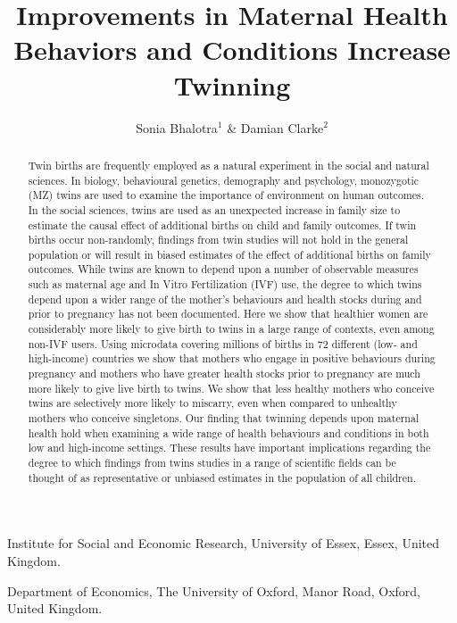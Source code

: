 \documentclass{nature}
\title{Improvements in Maternal Health Behaviors and Conditions Increase Twinning}
\author{Sonia Bhalotra$^{1}$ \& Damian Clarke$^2$}
\begin{document}
\maketitle

\begin{affiliations}
 \item Institute for Social and Economic Research, University of Essex, Essex, United Kingdom.
 \item Department of Economics, The University of Oxford, Manor Road, Oxford, United Kingdom.
\end{affiliations}

\begin{linenumbers}
\begin{abstract}
Twin births are frequently employed as a natural experiment in the social and natural sciences\cite{Boomsmaetal2002,Poldermanetal2015}.  In biology, behavioural genetics, demography and psychology, monozygotic (MZ) twins are used to examine the importance of environment on human outcomes\cite{Thorndike1905,Boomsmaetal2002,Poldermanetal2015,Phillips1993,BouchardPropping1993,McClearnetal1997,Nisen2013}. In the social sciences, twins are used as an unexpected increase in family size to estimate the causal effect of additional births on child and family outcomes\cite{WolpinRosenzweig2000,RosenzweigWolpin1980,AngristEvans1988}.  If twin births occur non-randomly, findings from twin studies will not hold in the general population or will result in biased estimates of the effect of additional births on family outcomes.  While twins are known to depend upon a number of observable measures such as maternal age and In Vitro Fertilization (IVF) use\cite{Hall2003,Hoekstraetal2008,Vitthalaetal2009}, the degree to which twins depend upon a wider range of the mother's behaviours and health stocks during and prior to pregnancy has not been documented.  Here we show that healthier women are considerably more likely to give birth to twins in a large range of contexts, even among non-IVF users.  Using microdata covering millions of births in 72 different (low- and high-income) countries we show that mothers who engage in positive behaviours during pregnancy and mothers who have greater health stocks prior to pregnancy are much more likely to give live birth to twins. We show that less healthy mothers who conceive twins are selectively more likely to miscarry, even when compared to unhealthy mothers who conceive singletons.  Our finding that twinning depends upon maternal health hold when examining a wide range of health behaviours and conditions in both low and high-income settings.  These results have important implications regarding the degree to which findings from twins studies in a range of scientific fields can be thought of as representative or unbiased estimates in the population of all children.
\end{abstract}




\end{linenumbers}
\end{document}
